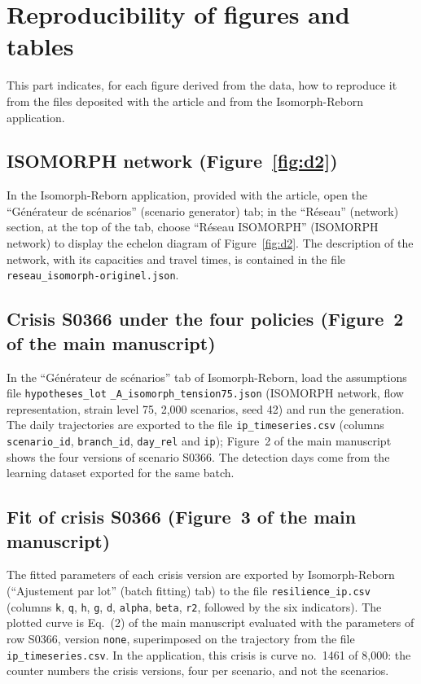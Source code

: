 \section{Reproducibility of figures and tables}
\label{sec:S7}
\sloppy


This part indicates, for each figure derived from the data, how to reproduce it from the files deposited with the article and from the Isomorph-Reborn application.

\subsection*{ISOMORPH network (Figure~\ref{fig:d2})}

In the Isomorph-Reborn application, provided with the article, open the ``Générateur de scénarios'' (scenario generator) tab; in the ``Réseau'' (network) section, at the top of the tab, choose ``Réseau ISOMORPH'' (ISOMORPH network) to display the echelon diagram of Figure~\ref{fig:d2}. The description of the network, with its capacities and travel times, is contained in the file \texttt{reseau\_isomorph-originel.json}.

\subsection*{Crisis S0366 under the four policies (Figure~2 of the main manuscript)}

In the ``Générateur de scénarios'' tab of Isomorph-Reborn, load the assumptions file \texttt{hypotheses\_lot} \texttt{\_A\_isomorph\_tension75.json} (ISOMORPH network, flow representation, strain level 75, 2,000 scenarios, seed 42) and run the generation. The daily trajectories are exported to the file \texttt{ip\_timeseries.csv} (columns \texttt{scenario\_id}, \texttt{branch\_id}, \texttt{day\_rel} and \texttt{ip}); Figure~2 of the main manuscript shows the four versions of scenario S0366. The detection days come from the learning dataset exported for the same batch.

\subsection*{Fit of crisis S0366 (Figure~3 of the main manuscript)}

The fitted parameters of each crisis version are exported by Isomorph-Reborn (``Ajustement par lot'' (batch fitting) tab) to the file \texttt{resilience\_ip.csv} (columns \texttt{k}, \texttt{q}, \texttt{h}, \texttt{g}, \texttt{d}, \texttt{alpha}, \texttt{beta}, \texttt{r2}, followed by the six indicators). The plotted curve is Eq.~(2) of the main manuscript evaluated with the parameters of row S0366, version \texttt{none}, superimposed on the trajectory from the file \texttt{ip\_timeseries.csv}. In the application, this crisis is curve no.~1461 of 8,000: the counter numbers the crisis versions, four per scenario, and not the scenarios.

